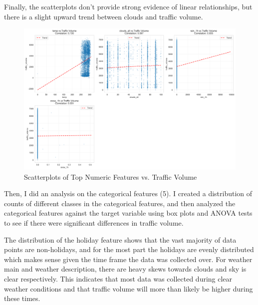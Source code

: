 \documentclass[12pt]{article}
\begin{document}
Finally, the scatterplots don't provide strong evidence of linear relationships, but there is a slight upward trend between clouds and traffic volume.
\begin{figure}[H]
    \centering
    \includegraphics[width=1\textwidth]{images/eda_scatter_plots.png}
    \caption{Scatterplots of Top Numeric Features vs. Traffic Volume}
    \label{fig:eda_numeric_scatterplots}
\end{figure}

Then, I did an analysis on the categorical features (5). I created a distribution of counts of different classes in the categorical features,
and then analyzed the categorical features against the target variable using box plots and ANOVA tests to see if there were significant differences in traffic volume.

The distribution of the holiday feature shows that the vast majority of data points are non-holidays, and for the most part the holidays are evenly distributed which makes sense given the time frame the data was collected over.
For weather main and weather description, there are heavy skews towards clouds and sky is clear respectively. This indicates that most data was collected during clear weather conditions and that traffic volume will more than likely
be higher during these times. 
\end{document}
